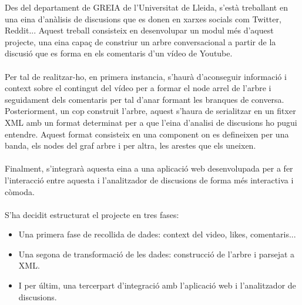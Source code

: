 
Des del departament de GREIA de l'Universitat de Lleida, s'està treballant 
en una eina d'anàlisis de discusions que es donen en xarxes socials com Twitter, Reddit... Aquest treball consisteix en desenvolupar un modul més 
d'aquest projecte, una eina capaç de constriur un arbre conversacional 
a partir de la discusió que es forma en els comentaris d'un vídeo de Youtube.\\\\
%
Per tal de realitzar-ho, en primera instancia, s'haurà d'aconseguir
informació i context sobre el contingut del vídeo per a formar el node 
arrel de l'arbre i seguidament dels comentaris per tal d'anar formant 
les branques de conversa. Posteriorment, un cop construit l'arbre, aquest
s'haura de serialitzar en un fitxer XML amb un format determinat per a que
l'eina d'analisi de discusions ho pugui entendre.
Aquest format consisteix en una component on es defineixen per una banda, 
els nodes del graf arbre i per altra, les arestes que els uneixen.\\\\
%
Finalment, s'integrarà aquesta eina a una aplicació web desenvolupada 
per a fer l'interacció entre aquesta i l'analitzador de discusions
de forma més interactiva i còmoda.\\\\
%
S'ha decidit estructurat el projecte en tres fases: 
\begin{itemize}
\item Una primera fase de recollida de dades: context del video, likes, comentaris...
\item Una segona de transformació de les dades: construcció de l'arbre i parsejat a XML.
\item I per últim, una tercerpart d'integració amb l'aplicació web i l'analitzador de discusions.
\end{itemize}
